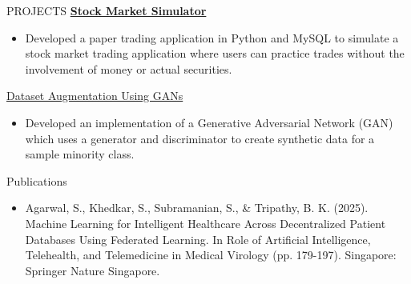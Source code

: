 \documentclass{resume} %
\begin{document}
\begin{rSection}{PROJECTS}
    \href{https://github.com/16sanchitkhedkar/stock_market_application}{\textbf{Stock Market Simulator}} \hfill 
        \begin{itemize}
            \item Developed a paper trading application in Python and MySQL to simulate a stock market trading application where users can practice trades without the involvement of money or actual securities.
        \end{itemize}
    \href{https://github.com/16sanchitkhedkar/Dataset-Augmentation-with-GANs-main}{Dataset Augmentation Using GANs} \hfill 
    \begin{itemize}
        \item Developed an implementation of a Generative Adversarial Network (GAN) which uses a generator and discriminator to create synthetic data for a sample minority class.
    \end{itemize}

\end{rSection} 

\begin{rSection}{Publications} 

\begin{itemize}
        \item Agarwal, S., Khedkar, S., Subramanian, S., \& Tripathy, B. K. (2025). Machine Learning for Intelligent Healthcare Across Decentralized Patient Databases Using Federated Learning. In Role of Artificial Intelligence, Telehealth, and Telemedicine in Medical Virology (pp. 179-197). Singapore: Springer Nature Singapore.
\end{itemize}

\end{rSection}
\end{document}
